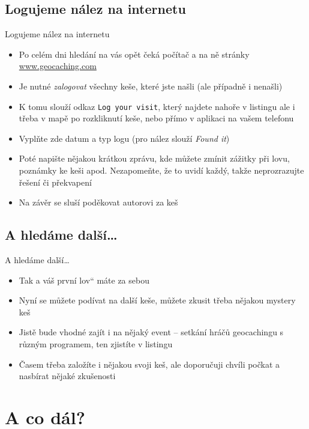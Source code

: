 \documentclass{beamer}
\providecommand{\uv}[1]{\quotedblbase #1\textquotedblleft}
\begin{document}
	\subsection{Logujeme nález na internetu}
	\begin{frame}{Logujeme nález na internetu}
		\begin{itemize}
			\item Po celém dni hledání na vás opět čeká počítač a na ně stránky \url{www.geocaching.com}
			\item Je nutné \emph{zalogovat} všechny keše, které jste našli (ale případně i nenašli)
			\item K tomu slouží odkaz \texttt{Log your visit}, který najdete nahoře v listingu ale i třeba v mapě po rozkliknutí keše, nebo přímo v aplikaci na vašem telefonu
			\item Vyplňte zde datum a typ logu (pro nález slouží \emph{Found it})
			\item Poté napište nějakou krátkou zprávu, kde můžete zmínit zážitky při lovu, poznámky ke keši apod. Nezapomeňte, že to uvidí každý, takže neprozrazujte řešení či překvapení
			\item Na závěr se sluší poděkovat autorovi za keš
		\end{itemize}
	\end{frame}
	
	\subsection{A hledáme další\dots}
	\begin{frame}{A hledáme další\dots}
		\begin{itemize}
			\item Tak a váš první \uv{lov} máte za sebou
			\item Nyní se můžete podívat na další keše, můžete zkusit třeba nějakou mystery keš
			\item Jistě bude vhodné zajít i na nějaký event -- setkání hráčů geocachingu s různým programem, ten zjistíte v listingu
			\item Časem třeba založíte i nějakou svoji keš, ale doporučuji chvíli počkat a nasbírat nějaké zkušenosti
		\end{itemize}
	\end{frame}
	
	\section{A co dál?}
\end{document}
